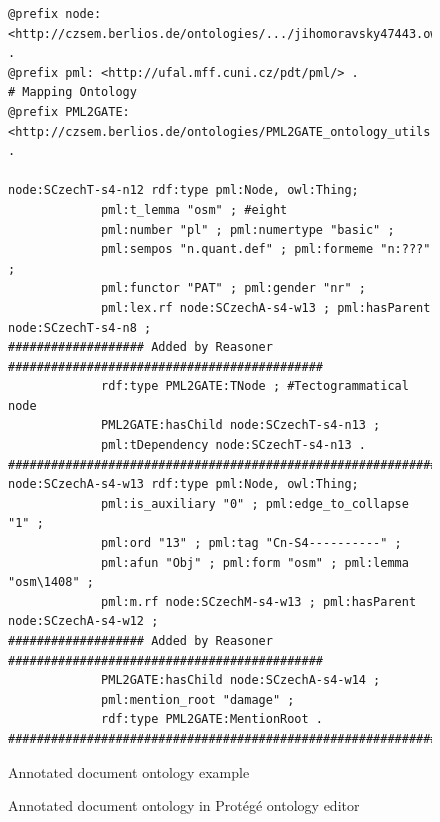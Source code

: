 



\begin{figure}
\begin{verbatim}
@prefix node: <http://czsem.berlios.de/ontologies/.../jihomoravsky47443.owl#node/> .
@prefix pml: <http://ufal.mff.cuni.cz/pdt/pml/> .
# Mapping Ontology
@prefix PML2GATE: <http://czsem.berlios.de/ontologies/PML2GATE_ontology_utils.owl#> .

node:SCzechT-s4-n12 rdf:type pml:Node, owl:Thing;
			 pml:t_lemma "osm" ; #eight
			 pml:number "pl" ; pml:numertype "basic" ;
			 pml:sempos "n.quant.def" ; pml:formeme "n:???" ;
			 pml:functor "PAT" ; pml:gender "nr" ;
			 pml:lex.rf node:SCzechA-s4-w13 ; pml:hasParent node:SCzechT-s4-n8 ;
################### Added by Reasoner ############################################
			 rdf:type PML2GATE:TNode ; #Tectogrammatical node
			 PML2GATE:hasChild node:SCzechT-s4-n13 ;
			 pml:tDependency node:SCzechT-s4-n13 .
##################################################################################
node:SCzechA-s4-w13 rdf:type pml:Node, owl:Thing;
			 pml:is_auxiliary "0" ; pml:edge_to_collapse "1" ;
			 pml:ord "13" ; pml:tag "Cn-S4----------" ;
			 pml:afun "Obj" ; pml:form "osm" ; pml:lemma "osm\1408" ;
			 pml:m.rf node:SCzechM-s4-w13 ; pml:hasParent node:SCzechA-s4-w12 ;
################### Added by Reasoner ############################################
			 PML2GATE:hasChild node:SCzechA-s4-w14 ;
			 pml:mention_root "damage" ;
			 rdf:type PML2GATE:MentionRoot .
##################################################################################
\end{verbatim}
\caption{Annotated document ontology example}
\label{fig:annotated_DO}
\end{figure}

\begin{figure}
\centerline{}
\caption{Annotated document ontology in Protégé ontology editor}
\label{fig:PDT_PROTEGE}
\end{figure}






